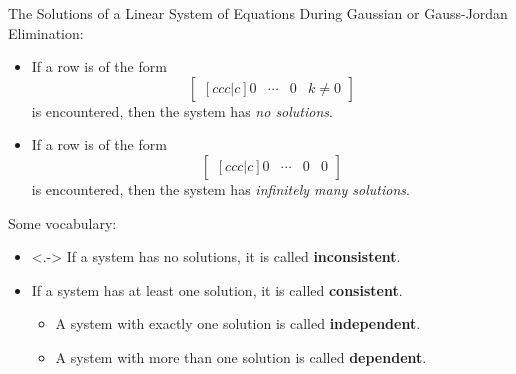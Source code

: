 \documentclass{beamer}
\begin{document}
\begin{frame}
\begin{block}{The Solutions of a Linear System of Equations}
During Gaussian or Gauss-Jordan Elimination:\pause
\begin{itemize}
\item<+->If a row is of the form
\begin{equation*}
\begin{bmatrix}[ccc|c]
0 & \cdots & 0 & k\neq 0
\end{bmatrix}
\end{equation*}
is encountered, then the system has \emph{no solutions}.
\item<+->
If a row is of the form
\begin{equation*}
\begin{bmatrix}[ccc|c]
0 & \cdots & 0 & 0
\end{bmatrix}
\end{equation*}
is encountered, then the system has \emph{infinitely many solutions}.
\end{itemize}
\onslide<+->
Some vocabulary:
\begin{itemize}
\item<.-> If a system has no solutions, it is called \textbf{inconsistent}.
\item<+-> If a system has at least one solution, it is called \textbf{consistent}.
\begin{itemize}
\item<+-> A system with exactly one solution is called \textbf{independent}.
\item<+-> A system with more than one solution is called \textbf{dependent}.
\end{itemize}
\end{itemize}
\end{block}
\end{frame}
\end{document}
